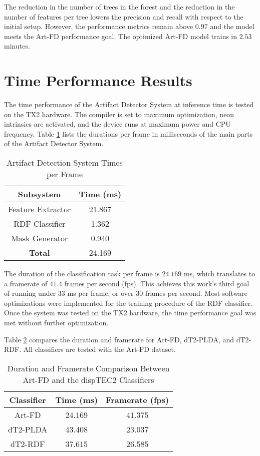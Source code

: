 The reduction in the number of trees in the forest and the reduction in the number of features per tree lowers the precision and recall with respect to the initial setup. However, the performance metrics remain above $0.97$ and the model meets the Art-FD performance goal. The optimized Art-FD model trains in $2.53$ minutes.

\section{Time Performance Results}
\label{sec:res_speed}

The time performance of the Artifact Detector System at inference time is tested on the TX2 hardware. The compiler is set to maximum optimization, neon intrinsics are activated, and the device runs at maximum power and CPU frequency. Table \ref{tab:times} lists the durations per frame in milliseconds of the main parts of the Artifact Detector System.

\begin{table}[htbp]
  \caption{Artifact Detection System Times per Frame}
  \label{tab:times}
  \centering
  \begin{tabular}{cc}
    \hline
    \textbf{Subsystem} & \textbf{Time ($\mathbf{ms}$)} \\ \hline
    Feature Extractor & 21.867 \\
    RDF Classifier & 1.362 \\
    Mask Generator & 0.940 \\ \hline
    \textbf{Total} & 24.169 \\ \hline
  \end{tabular}
\end{table}

The duration of the classification task per frame is $24.169$ ms, which translates to a framerate of $41.4$ frames per second (fps). This achieves this work's third goal of running under $33$ ms per frame, or over $30$ frames per second. Most software optimizations were implemented for the training procedure of the RDF classifier. Once the system was tested on the TX2 hardware, the time performance goal was met without further optimization.

Table \ref{tab:time_comp} compares the duration and framerate for Art-FD, dT2-PLDA, and dT2-RDF. All classifiers are tested with the Art-FD dataset.

\begin{table}[htbp]
  \caption{Duration and Framerate Comparison Between Art-FD and the dispTEC2 Classifiers}
  \label{tab:time_comp}
  \centering
  \begin{tabular}{ccc}
    \hline
    \textbf{Classifier} & \textbf{Time ($\mathbf{ms}$)} & \textbf{Framerate ($\mathbf{fps}$)} \\ \hline
    Art-FD & 24.169 & 41.375 \\
    dT2-PLDA & 43.408 & 23.037 \\
    dT2-RDF & 37.615 & 26.585 \\ \hline
  \end{tabular}
\end{table}
